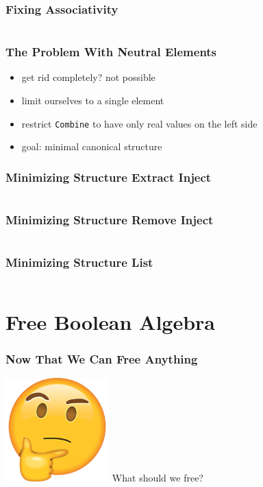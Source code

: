 \documentclass{beamer}
\begin{document}
\begin{frame}
  \frametitle{Fixing Associativity}
  \inputminted{scala}{snippets/free-monoid-2.scala}
\end{frame}

\begin{frame}
  \frametitle{The Problem With Neutral Elements}
  \begin{itemize}
  \item get rid completely? not possible
  \item limit ourselves to a single element
  \item restrict \texttt{Combine} to have only real values on the left side
  \item goal: minimal canonical structure
  \end{itemize}
\end{frame}

\begin{frame}
  \frametitle{Minimizing Structure \textemdash{} Extract Inject}
  \inputminted{scala}{snippets/free-monoid-3.scala}
\end{frame}

\begin{frame}
  \frametitle{Minimizing Structure \textemdash{} Remove Inject}
  \inputminted{scala}{snippets/free-monoid-4.scala}
\end{frame}

\begin{frame}
  \frametitle{Minimizing Structure \textemdash{} List}
  \inputminted{scala}{snippets/free-monoid-5.scala}
\end{frame}

\section{Free Boolean Algebra}\label{sec:free-boolean-algebra}

\begin{frame}
  \frametitle{Now That We Can Free Anything}
  \begin{center}
    \includegraphics[width=0.3\textwidth]{static-images/thinking.png}
    \vfill
    {\Huge What should we free?}
    \vfill
  \end{center}
\end{frame}
\end{document}
